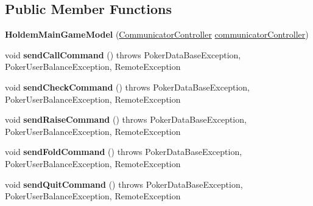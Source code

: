 \subsection*{Public Member Functions}
\begin{DoxyCompactItemize}
\item 
\hypertarget{classhu_1_1elte_1_1bfw1p6_1_1poker_1_1client_1_1model_1_1_holdem_main_game_model_a8a2667d4e0e81d15c61182b8334a098e}{}{\bfseries Holdem\+Main\+Game\+Model} (\hyperlink{classhu_1_1elte_1_1bfw1p6_1_1poker_1_1client_1_1controller_1_1main_1_1_communicator_controller}{Communicator\+Controller} \hyperlink{classhu_1_1elte_1_1bfw1p6_1_1poker_1_1client_1_1model_1_1_abstract_main_game_model_a0adcdebb5bfb2f8e958584d49d650386}{communicator\+Controller})\label{classhu_1_1elte_1_1bfw1p6_1_1poker_1_1client_1_1model_1_1_holdem_main_game_model_a8a2667d4e0e81d15c61182b8334a098e}

\item 
\hypertarget{classhu_1_1elte_1_1bfw1p6_1_1poker_1_1client_1_1model_1_1_holdem_main_game_model_abcbe94201859353b3126a8accf2a8e94}{}void {\bfseries send\+Call\+Command} ()  throws Poker\+Data\+Base\+Exception, Poker\+User\+Balance\+Exception, Remote\+Exception \label{classhu_1_1elte_1_1bfw1p6_1_1poker_1_1client_1_1model_1_1_holdem_main_game_model_abcbe94201859353b3126a8accf2a8e94}

\item 
\hypertarget{classhu_1_1elte_1_1bfw1p6_1_1poker_1_1client_1_1model_1_1_holdem_main_game_model_a4e4774ce30c344c5b0cb31afaff7656c}{}void {\bfseries send\+Check\+Command} ()  throws Poker\+Data\+Base\+Exception, Poker\+User\+Balance\+Exception, Remote\+Exception \label{classhu_1_1elte_1_1bfw1p6_1_1poker_1_1client_1_1model_1_1_holdem_main_game_model_a4e4774ce30c344c5b0cb31afaff7656c}

\item 
\hypertarget{classhu_1_1elte_1_1bfw1p6_1_1poker_1_1client_1_1model_1_1_holdem_main_game_model_a5abbfb46557b0b12d016635b4c772401}{}void {\bfseries send\+Raise\+Command} ()  throws Poker\+Data\+Base\+Exception, Poker\+User\+Balance\+Exception, Remote\+Exception \label{classhu_1_1elte_1_1bfw1p6_1_1poker_1_1client_1_1model_1_1_holdem_main_game_model_a5abbfb46557b0b12d016635b4c772401}

\item 
\hypertarget{classhu_1_1elte_1_1bfw1p6_1_1poker_1_1client_1_1model_1_1_holdem_main_game_model_a07615be610999ff4e5a48bc2f0218856}{}void {\bfseries send\+Fold\+Command} ()  throws Poker\+Data\+Base\+Exception, Poker\+User\+Balance\+Exception, Remote\+Exception \label{classhu_1_1elte_1_1bfw1p6_1_1poker_1_1client_1_1model_1_1_holdem_main_game_model_a07615be610999ff4e5a48bc2f0218856}

\item 
\hypertarget{classhu_1_1elte_1_1bfw1p6_1_1poker_1_1client_1_1model_1_1_holdem_main_game_model_a5131d9ebb58dd07e5a6d1f1878d05666}{}void {\bfseries send\+Quit\+Command} ()  throws Poker\+Data\+Base\+Exception, Poker\+User\+Balance\+Exception, Remote\+Exception \label{classhu_1_1elte_1_1bfw1p6_1_1poker_1_1client_1_1model_1_1_holdem_main_game_model_a5131d9ebb58dd07e5a6d1f1878d05666}

\end{DoxyCompactItemize}
